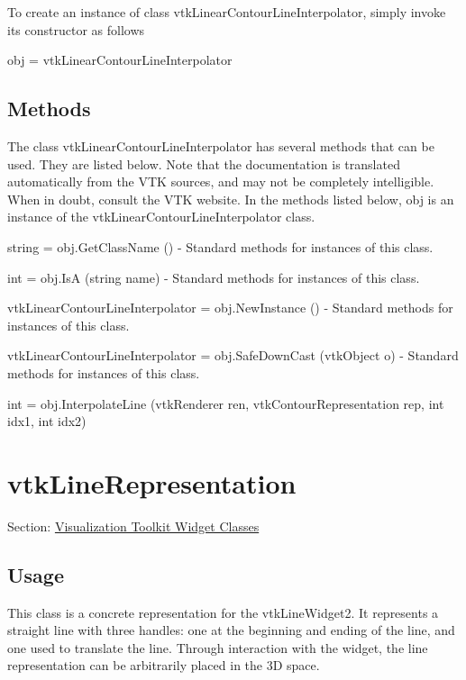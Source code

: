 To create an instance of class vtk\-Linear\-Contour\-Line\-Interpolator, simply invoke its constructor as follows \begin{DoxyVerb}  obj = vtkLinearContourLineInterpolator
\end{DoxyVerb}
 \hypertarget{vtkwidgets_vtkxyplotwidget_Methods}{}\subsection{Methods}\label{vtkwidgets_vtkxyplotwidget_Methods}
The class vtk\-Linear\-Contour\-Line\-Interpolator has several methods that can be used. They are listed below. Note that the documentation is translated automatically from the V\-T\-K sources, and may not be completely intelligible. When in doubt, consult the V\-T\-K website. In the methods listed below, {\ttfamily obj} is an instance of the vtk\-Linear\-Contour\-Line\-Interpolator class. 
\begin{DoxyItemize}
\item {\ttfamily string = obj.\-Get\-Class\-Name ()} -\/ Standard methods for instances of this class.  
\item {\ttfamily int = obj.\-Is\-A (string name)} -\/ Standard methods for instances of this class.  
\item {\ttfamily vtk\-Linear\-Contour\-Line\-Interpolator = obj.\-New\-Instance ()} -\/ Standard methods for instances of this class.  
\item {\ttfamily vtk\-Linear\-Contour\-Line\-Interpolator = obj.\-Safe\-Down\-Cast (vtk\-Object o)} -\/ Standard methods for instances of this class.  
\item {\ttfamily int = obj.\-Interpolate\-Line (vtk\-Renderer ren, vtk\-Contour\-Representation rep, int idx1, int idx2)}  
\end{DoxyItemize}\hypertarget{vtkwidgets_vtklinerepresentation}{}\section{vtk\-Line\-Representation}\label{vtkwidgets_vtklinerepresentation}
Section\-: \hyperlink{sec_vtkwidgets}{Visualization Toolkit Widget Classes} \hypertarget{vtkwidgets_vtkxyplotwidget_Usage}{}\subsection{Usage}\label{vtkwidgets_vtkxyplotwidget_Usage}
This class is a concrete representation for the vtk\-Line\-Widget2. It represents a straight line with three handles\-: one at the beginning and ending of the line, and one used to translate the line. Through interaction with the widget, the line representation can be arbitrarily placed in the 3\-D space.

